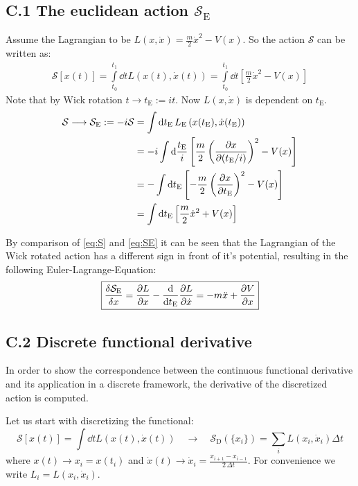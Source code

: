 \documentclass[11pt,a4paper]{scrartcl}
\newcommand{\action}{\ensuremath{\mathcal{S}}}
\newcommand{\SD}{\ensuremath{\mathcal{S}_{\mathrm{D}}}}
\newcommand{\xdoti}{\ensuremath{\dot{x}_i}}
\newcommand{\OverTwoDeltaT}[1]{\ensuremath{\frac{#1}{2\, \Delta t}}}
\newcommand{\SE}{\ensuremath{\mathcal{S}_{\mathrm{E}}}}
\newcommand{\tE}{\ensuremath{t_{\mathrm{E}}}}
\begin{document}
\subsection*{C.1 The euclidean action \SE}
\label{app:derivSE}
Assume the Lagrangian to be $L(x,\dot{x})=\frac{m}{2} \dot{x}^2-V(x)$. So the
action $\action$ can be written as:
\begin{align}
    \action\left[x(t)\right] = \int\limits_{t_0}^{t_1}\dd{t}L\left(x(t), \dot{x}(t)\right) = \int\limits_{t_0}^{t_1}\dd{t}\left[\frac{m}{2}\dot{x}^2-V(x)\right]\label{eq:S}
\end{align}
Note that by Wick rotation $t\longrightarrow \tE:=it$. Now $L(x,\dot{x})$ is
dependent on \tE.
\begin{align}
    \action\longrightarrow\SE:=-i\action
    &=\int\dd{\tE}L_\mathrm{E}\left(x(t_\mathrm{E}),
    \dot{x}(t_\mathrm{E})\right) \nonumber \\
    &=-i\int\dd\frac{\tE}{i}\left[\frac{m}{2}\left(\pdv{x}{(\tE/i)}\right)^2-V(x)\right]
    \nonumber \\
    &=-\int\dd\tE\left[-\frac{m}{2}\left(\pdv{x}{\tE}\right)^2-V(x)\right]
    \nonumber \\
    &=\int\dd\tE\left[\frac{m}{2}\dot{x}^2+V(x)\right] \label{eq:SE}
\end{align}

By comparison of \cref{eq:S} and \cref{eq:SE} it can be seen that the
Lagrangian of the Wick rotated action has a different sign in front of it's
potential, resulting in the following Euler-Lagrange-Equation:
\begin{equation}
    \boxed{%
        \fdv{\SE}{x}=\pdv{L}{x}-\dv{\tE}\pdv{L}{\dot{x}}=-m\ddot{x}+\pdv{V}{x}
    }
\end{equation}


\subsection*{C.2 Discrete functional derivative}
\label{app:deriv-discrete}
In order to show the correspondence between the continuous functional
derivative and its application in a discrete framework, the derivative of the
discretized action is computed.

Let us start with discretizing the functional:
\begin{equation}
    \mathcal{S}\left[x(t)\right] = \int\dd{t}L\left(x(t), \dot{x}(t)\right)
    \quad\longrightarrow\quad
    \SD\left(\{x_i\}\right) = \sum_i L\left(x_i, \xdoti\right)\Delta t
\end{equation}
where $x(t) \longrightarrow x_i = x(t_i)$ and $\dot{x}(t) \longrightarrow
\xdoti = \OverTwoDeltaT{x_{i+1}-x_{i-1}}$. For convenience we write $L_i = L(x_i, \xdoti)$.
\end{document}
